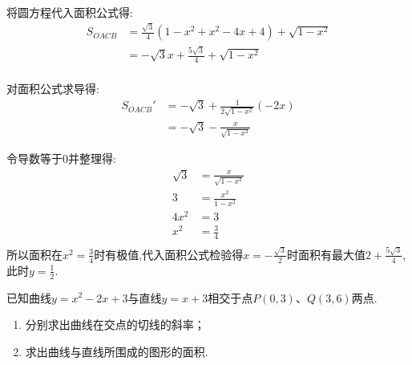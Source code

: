\begin{questions}
\begin{solution}
\begin{cenum}
			\item 将圆方程代入面积公式得:
			      \begin{align*}
				      S_{OACB} & = \frac{\sqrt{3}}{4}(1-x^2 + x^2 - 4x + 4) + \sqrt{1-x^2} \\
				               & = -\sqrt{3}x + \frac{5\sqrt{3}}{4} + \sqrt{1-x^2}         \\
			      \end{align*}
			\item 对面积公式求导得:
			      \begin{align*}
				      S_{OACB}' & = -\sqrt{3}  + \frac{1}{2\sqrt{1-x^2}}(-2x) \\
				                & =  -\sqrt{3} - \frac{x}{\sqrt{1-x^2}}
			      \end{align*}
			\item 令导数等于$0$并整理得:
			      \begin{align*}
				      \sqrt{3} & = \frac{x}{\sqrt{1-x^2}} \\
				      3        & = \frac{x^2}{1-x^2}      \\
				      4x^2     & = 3                      \\
				      x^2      & = \frac34                \\
			      \end{align*}
			      所以面积在$x^2 = \frac34$时有极值,代入面积公式检验得$x=-\frac{\sqrt{3}}{2}$时面积有最大值$2 +
				      \frac{5\sqrt{3}}{4}$,此时$y=\frac12$.
		\end{cenum}
	\end{solution}

	\question 已知曲线$y=x^2-2x+3$与直线$y=x+3$相交于点$P(0,3)$、$Q(3,6)$两点.
	\begin{enumerate}[label=(\arabic*)]
		\item 分别求出曲线在交点的切线的斜率；
		\item 求出曲线与直线所围成的图形的面积.
	\end{enumerate}
	\pagebreak
	\begin{solution}
		\begin{center}
\end{center}
\end{solution}
\end{questions}
